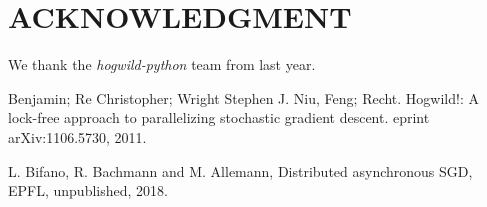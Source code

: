 \documentclass[a4paper, 11pt, conference]{ieeeconf}
\begin{document}
\thispagestyle{empty}



\section*{ACKNOWLEDGMENT}

We thank the \textit{hogwild-python} team from last year.


\begin{thebibliography}{99} 

 Benjamin; Re Christopher; Wright Stephen J. Niu, Feng; Recht. Hogwild!: A lock-free approach to parallelizing stochastic gradient descent. eprint arXiv:1106.5730, 2011.

 L. Bifano, R. Bachmann and M. Allemann, Distributed asynchronous SGD, EPFL, unpublished, 2018.

\end{thebibliography}
\end{document}
